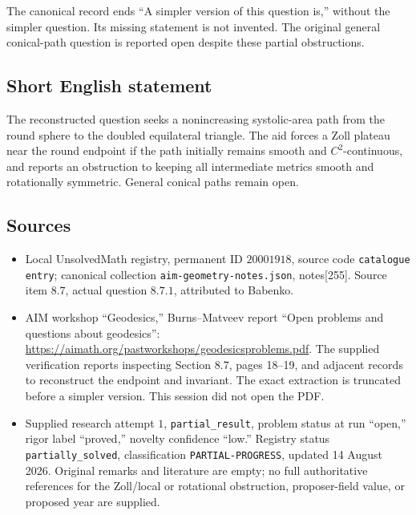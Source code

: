 \documentclass[11pt]{article}
\begin{document}
The canonical record ends ``A simpler version of this question is,'' without the simpler question. Its missing statement is not invented. The original general conical-path question is reported open despite these partial obstructions.
\subsection{Short English statement}
The reconstructed question seeks a nonincreasing systolic-area path from the round sphere to the doubled equilateral triangle. The aid forces a Zoll plateau near the round endpoint if the path initially remains smooth and \(C^2\)-continuous, and reports an obstruction to keeping all intermediate metrics smooth and rotationally symmetric. General conical paths remain open.
\subsection{Sources}
\begin{itemize}
\item Local UnsolvedMath registry, permanent ID \(20001918\), source code \texttt{catalogue entry}; canonical collection \texttt{aim-geometry-notes.json}, notes[255]. Source item \(8.7\), actual question \(8.7.1\), attributed to Babenko.
\item AIM workshop ``Geodesics,'' Burns--Matveev report ``Open problems and questions about geodesics'': \url{https://aimath.org/pastworkshops/geodesicsproblems.pdf}. The supplied verification reports inspecting Section \(8.7\), pages 18--19, and adjacent records to reconstruct the endpoint and invariant. The exact extraction is truncated before a simpler version. This session did not open the PDF.
\item Supplied research attempt \(1\), \texttt{partial\_result}, problem status at run ``open,'' rigor label ``proved,'' novelty confidence ``low.'' Registry status \texttt{partially\_solved}, classification \texttt{PARTIAL-PROGRESS}, updated 14 August 2026. Original remarks and literature are empty; no full authoritative references for the Zoll/local or rotational obstruction, proposer-field value, or proposed year are supplied.
\end{itemize}
\end{document}
